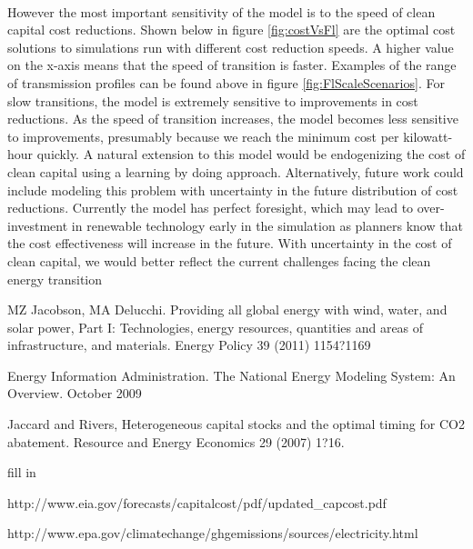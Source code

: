 \documentclass{easychithesis}
\begin{document}
\paragraph{} However the most important sensitivity of the model is to the speed of clean capital cost reductions. Shown below in figure \ref{fig:costVsFl} are the optimal cost solutions to simulations run with different cost reduction speeds. A higher value on the x-axis means that the speed of transition is faster. Examples of the range of transmission profiles can be found above in figure \ref{fig:FlScaleScenarios}. For slow transitions, the model is extremely sensitive to improvements in cost reductions. As the speed of transition increases, the model becomes less sensitive to improvements, presumably because we reach the minimum cost per kilowatt-hour quickly. A natural extension to this model would be endogenizing the cost of clean capital using a learning by doing approach. Alternatively, future work could include modeling this problem with uncertainty in the future distribution of cost reductions. Currently the model has perfect foresight, which may lead to over-investment in renewable technology early in the simulation as planners know that the cost effectiveness will increase in the future. With uncertainty in the cost of clean capital, we would better reflect the current challenges facing the clean energy transition











\singlespacing
\pagebreak
{}

\begin{thebibliography}{99}

MZ Jacobson, MA Delucchi. Providing all global energy with wind, water, and solar power, Part I: Technologies, energy resources, quantities and areas of infrastructure, and materials. Energy Policy 39 (2011) 1154?1169

Energy Information Administration. The National Energy Modeling System: An Overview. October 2009

Jaccard and Rivers, Heterogeneous capital stocks and the optimal timing for CO2 abatement. Resource and Energy Economics 29 (2007) 1?16.

fill in

http://www.eia.gov/forecasts/capitalcost/pdf/updated\_capcost.pdf

http://www.epa.gov/climatechange/ghgemissions/sources/electricity.html


\end{thebibliography}
\end{document}
